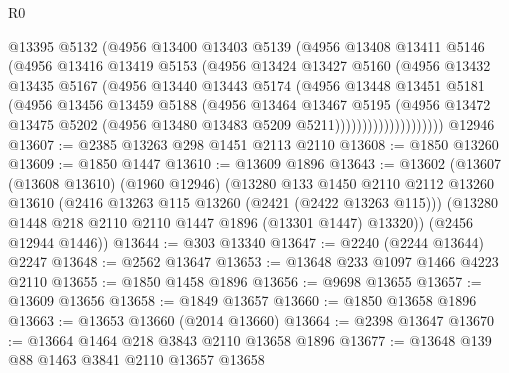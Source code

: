 \begin{lexlean}{R0}
\begin{coremodule}
                      @13395
                      @5132
                      (@4956
                        @13400
                        @13403
                        @5139
                        (@4956
                          @13408
                          @13411
                          @5146
                          (@4956
                            @13416
                            @13419
                            @5153
                            (@4956
                              @13424
                              @13427
                              @5160
                              (@4956
                                @13432
                                @13435
                                @5167
                                (@4956
                                  @13440
                                  @13443
                                  @5174
                                  (@4956
                                    @13448
                                    @13451
                                    @5181
                                    (@4956
                                      @13456
                                      @13459
                                      @5188
                                      (@4956
                                        @13464
                                        @13467
                                        @5195
                                        (@4956
                                          @13472
                                          @13475
                                          @5202
                                          (@4956 @13480 @13483 @5209 @5211))))))))))))))))))))
    @12946
@13607 := @2385 @13263 @298 @1451 @2113 @2110
@13608 := @1850 @13260
@13609 := @1850 @1447
@13610 := @13609 @1896
@13643 := @13602
    (@13607
      (@13608 @13610)
      (@1960 @12946)
      (@13280
        @133
        @1450
        @2110
        @2112
        @13260
        @13610
        (@2416 @13263 @115 @13260 (@2421 (@2422 @13263 @115)))
        (@13280 @1448 @218 @2110 @2110 @1447 @1896 (@13301 @1447) @13320))
      (@2456 @12944 @1446))
@13644 := @303 @13340
@13647 := @2240 (@2244 @13644) @2247
@13648 := @2562 @13647
@13653 := @13648 @233 @1097 @1466 @4223 @2110
@13655 := @1850 @1458 @1896
@13656 := @9698 @13655
@13657 := @13609 @13656
@13658 := @1849 @13657
@13660 := @1850 @13658 @1896
@13663 := @13653 @13660 (@2014 @13660)
@13664 := @2398 @13647
@13670 := @13664 @1464 @218 @3843 @2110 @13658 @1896
@13677 := @13648 @139 @88 @1463 @3841 @2110 @13657 @13658

\end{coremodule}
\end{lexlean}
